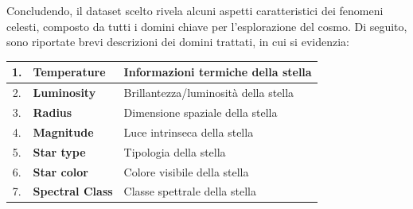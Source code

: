 \documentclass{article}
\begin{document}
    Concludendo, il dataset scelto rivela alcuni aspetti caratteristici dei fenomeni celesti, composto da tutti i domini chiave per l'esplorazione del cosmo. Di seguito, sono riportate brevi descrizioni dei domini trattati, in cui si evidenzia: \vspace*{7pt}\\
    \begin{tabularx}{\textwidth}{|c|X|X|}
        \hline
        1. & \textbf{Temperature} & Informazioni termiche della stella \\
        \hline
        2. & \textbf{Luminosity} & Brillantezza/luminosità della stella \\
        \hline
        3. & \textbf{Radius} & Dimensione spaziale della stella \\
        \hline
        4. & \textbf{Magnitude} & Luce intrinseca della stella \\
        \hline
        5. & \textbf{Star type} & Tipologia della stella \\
        \hline
        6. & \textbf{Star color} & Colore visibile della stella \\
        \hline
        7. & \textbf{Spectral Class} & Classe spettrale della stella \\
        \hline
    \end{tabularx}

    \newpage
\end{document}
